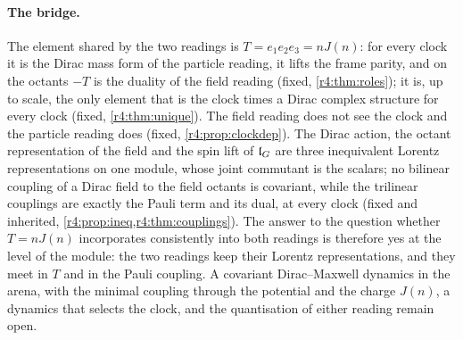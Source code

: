 \paragraph{The bridge.} The element shared by the two readings is $T=e_1e_2e_3=nJ(n)$: for every clock it is the Dirac mass form of the
particle reading, it lifts the frame parity, and on the octants $-T$ is the duality of the field reading (fixed, \cref{r4:thm:roles}); it is,
up to scale, the only element that is the clock times a Dirac complex structure for every clock (fixed, \cref{r4:thm:unique}). The field
reading does not see the clock and the particle reading does (fixed, \cref{r4:prop:clockdep}). The Dirac action, the octant representation
of the field and the spin lift of $\mathfrak l_G$ are three inequivalent Lorentz representations on one module, whose joint commutant is the
scalars; no bilinear coupling of a Dirac field to the field octants is covariant, while the trilinear couplings are exactly the Pauli
term and its dual, at every clock (fixed and inherited, \cref{r4:prop:ineq,r4:thm:couplings}). The answer to the question whether $T=nJ(n)$
incorporates consistently into both readings is therefore yes at the level of the module: the two readings keep their Lorentz
representations, and they meet in $T$ and in the Pauli coupling. A covariant Dirac--Maxwell dynamics in the arena, with the minimal coupling
through the potential and the charge $J(n)$, a dynamics that selects the clock, and the quantisation of either reading remain open.
